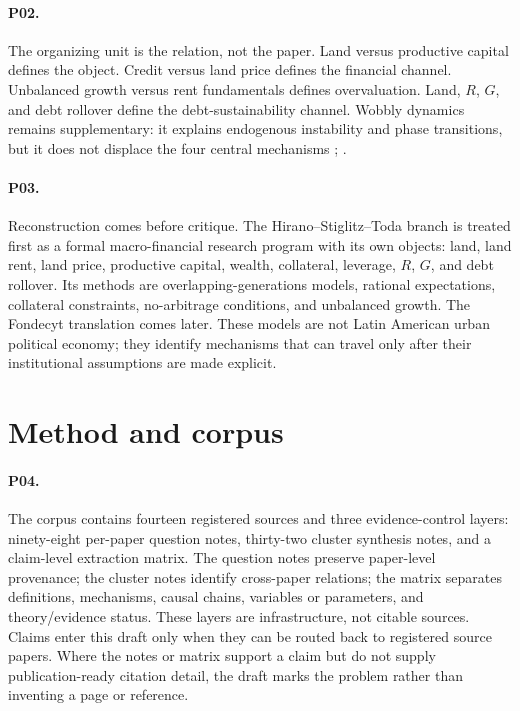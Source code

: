 \documentclass[11pt]{article}
\newcommand{\SHT}{Hirano--Stiglitz--Toda}
\begin{document}
\paragraph{P02.} The organizing unit is the relation, not the paper. Land versus productive capital defines the object. Credit versus land price defines the financial channel. Unbalanced growth versus rent fundamentals defines overvaluation. Land, \(R\), \(G\), and debt rollover define the debt-sustainability channel. Wobbly dynamics remains supplementary: it explains endogenous instability and phase transitions, but it does not displace the four central mechanisms \citep[pp.~7, 24, 46--47]{hiranoStiglitz2022LandSpeculation}; \citep[pp.~1--2, 10]{hiranoStiglitz2022WobblyEconomy}.

\paragraph{P03.} Reconstruction comes before critique. The \SHT{} branch is treated first as a formal macro-financial research program with its own objects: land, land rent, land price, productive capital, wealth, collateral, leverage, \(R\), \(G\), and debt rollover. Its methods are overlapping-generations models, rational expectations, collateral constraints, no-arbitrage conditions, and unbalanced growth. The Fondecyt translation comes later. These models are not Latin American urban political economy; they identify mechanisms that can travel only after their institutional assumptions are made explicit.

\section{Method and corpus}

\paragraph{P04.} The corpus contains fourteen registered sources and three evidence-control layers: ninety-eight per-paper question notes, thirty-two cluster synthesis notes, and a claim-level extraction matrix. The question notes preserve paper-level provenance; the cluster notes identify cross-paper relations; the matrix separates definitions, mechanisms, causal chains, variables or parameters, and theory/evidence status. These layers are infrastructure, not citable sources. Claims enter this draft only when they can be routed back to registered source papers. Where the notes or matrix support a claim but do not supply publication-ready citation detail, the draft marks the problem rather than inventing a page or reference.
\end{document}
